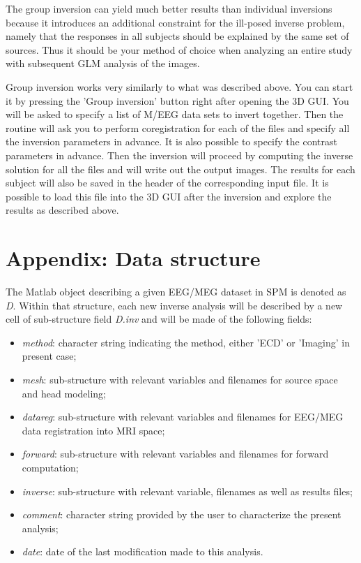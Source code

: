 The group inversion can yield much better results
than individual inversions because it introduces an additional constraint for the ill-posed inverse problem, namely that the responses in all subjects should be explained
by the same set of sources. Thus it should be your method of choice when analyzing an entire study with subsequent GLM analysis of the images. 

Group inversion works very similarly to
what was described above. You can start it by pressing the 'Group inversion' button right after opening the 3D GUI. You will be asked to specify a list of M/EEG data sets to invert together.
Then the routine will ask you to perform coregistration for each of the files and specify all the inversion parameters in advance. It is also possible to specify the contrast parameters in advance.
Then the inversion will proceed by computing the inverse solution for all the files and will write out the output images. The results for each subject will also be saved in the header
of the corresponding input file. It is possible to load this file into the 3D GUI after the inversion and explore the results as described above.

\section{Appendix: Data structure}
The Matlab object describing a given EEG/MEG dataset in SPM is denoted as \textit{D}.
Within that structure, each new inverse analysis will be described by a new cell of sub-structure
field \textit{D.inv} and will be made of the following fields:

\begin{itemize}
    \item \textit{method}: character string indicating the method, either 'ECD' or 'Imaging' in present case;
    \item \textit{mesh}: sub-structure with relevant variables and filenames for source space and head modeling;
    \item \textit{datareg}: sub-structure with relevant variables and filenames for EEG/MEG data registration into MRI space;
    \item \textit{forward}: sub-structure with relevant variables and filenames for forward computation;
    \item \textit{inverse}: sub-structure with relevant variable, filenames as well as results files;
    \item \textit{comment}: character string provided by the user to characterize the present analysis;
    \item \textit{date}: date of the last modification made to this analysis.
\end{itemize}

